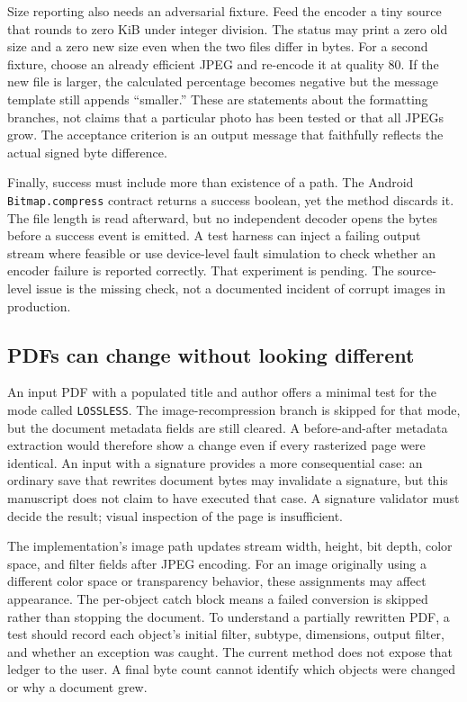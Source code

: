 \documentclass[10pt,letterpaper]{article}
\begin{document}
Size reporting also needs an adversarial fixture. Feed the encoder a tiny source that rounds to zero KiB under integer division. The status may print a zero old size and a zero new size even when the two files differ in bytes. For a second fixture, choose an already efficient JPEG and re-encode it at quality 80. If the new file is larger, the calculated percentage becomes negative but the message template still appends ``smaller.'' These are statements about the formatting branches, not claims that a particular photo has been tested or that all JPEGs grow. The acceptance criterion is an output message that faithfully reflects the actual signed byte difference.

Finally, success must include more than existence of a path. The Android \texttt{Bitmap.compress} contract returns a success boolean, yet the method discards it. The file length is read afterward, but no independent decoder opens the bytes before a success event is emitted. A test harness can inject a failing output stream where feasible or use device-level fault simulation to check whether an encoder failure is reported correctly. That experiment is pending. The source-level issue is the missing check, not a documented incident of corrupt images in production.

\subsection{PDFs can change without looking different}

An input PDF with a populated title and author offers a minimal test for the mode called \texttt{LOSSLESS}. The image-recompression branch is skipped for that mode, but the document metadata fields are still cleared. A before-and-after metadata extraction would therefore show a change even if every rasterized page were identical. An input with a signature provides a more consequential case: an ordinary save that rewrites document bytes may invalidate a signature, but this manuscript does not claim to have executed that case. A signature validator must decide the result; visual inspection of the page is insufficient.

The implementation's image path updates stream width, height, bit depth, color space, and filter fields after JPEG encoding. For an image originally using a different color space or transparency behavior, these assignments may affect appearance. The per-object catch block means a failed conversion is skipped rather than stopping the document. To understand a partially rewritten PDF, a test should record each object's initial filter, subtype, dimensions, output filter, and whether an exception was caught. The current method does not expose that ledger to the user. A final byte count cannot identify which objects were changed or why a document grew.
\end{document}
